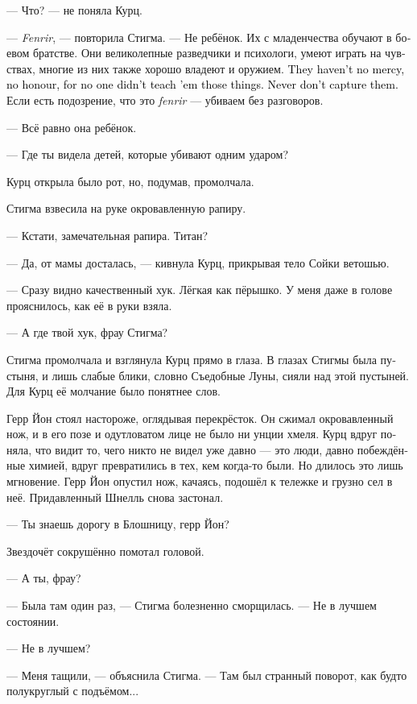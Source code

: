 \documentclass[a4paper,12pt,fleqn]{book}\usepackage{cooltooltips}\usepackage{polyglossia}\setdefaultlanguage[babelshorthands=true]{russian}\setotherlanguage{english}\defaultfontfeatures{Ligatures=TeX,Mapping=tex-text} \usepackage{xcolor}\definecolor{lightgray}{HTML}{bbbbbb}\color{lightgray}\newcommand{\ml}[3]{\textenglish{\textcolor{black}{#3}}}
\begin{document}
--- Что? --- не поняла Курц.

--- \textit{Fenrir}, --- повторила Стигма.
--- Не ребёнок.
Их с младенчества обучают в боевом братстве.
Они великолепные разведчики и психологи, умеют играть на чувствах, многие из них также хорошо владеют и оружием.
\ml{$0$}
{Но в них нет ни жалости, ни чести, потому что никто их этому не учил.}
{They haven't no mercy, no honour, for no one didn't teach 'em those things.}
\ml{$0$}
{В плен таких не берём.}
{Never don't capture them.}
Если есть подозрение, что это \textit{fenrir} --- убиваем без разговоров.

--- Всё равно она ребёнок.

--- Где ты видела детей, которые убивают одним ударом?

Курц открыла было рот, но, подумав, промолчала.

Стигма взвесила на руке окровавленную рапиру.

--- Кстати, замечательная рапира.
Титан?

--- Да, от мамы досталась, --- кивнула Курц, прикрывая тело Сойки ветошью.

--- Сразу видно качественный хук.
Лёгкая как пёрышко.
У меня даже в голове прояснилось, как её в руки взяла.

--- А где твой хук, фрау Стигма?

Стигма промолчала и взглянула Курц прямо в глаза.
В глазах Стигмы была пустыня, и лишь слабые блики, словно Съедобные Луны, сияли над этой пустыней.
Для Курц её молчание было понятнее слов.

Герр Йон стоял настороже, оглядывая перекрёсток.
Он сжимал окровавленный нож, и в его позе и одутловатом лице не было ни унции хмеля.
Курц вдруг поняла, что видит то, чего никто не видел уже давно --- это люди, давно побеждённые химией, вдруг превратились в тех, кем когда-то были.
Но длилось это лишь мгновение.
Герр Йон опустил нож, качаясь, подошёл к тележке и грузно сел в неё.
Придавленный Шнелль снова застонал.

--- Ты знаешь дорогу в Блошницу, герр Йон?

Звездочёт сокрушённо помотал головой.

--- А ты, фрау?

--- Была там один раз, --- Стигма болезненно сморщилась.
--- Не в лучшем состоянии.

--- Не в лучшем?

--- Меня тащили, --- объяснила Стигма.
--- Там был странный поворот, как будто полукруглый с подъёмом...
\end{document}
